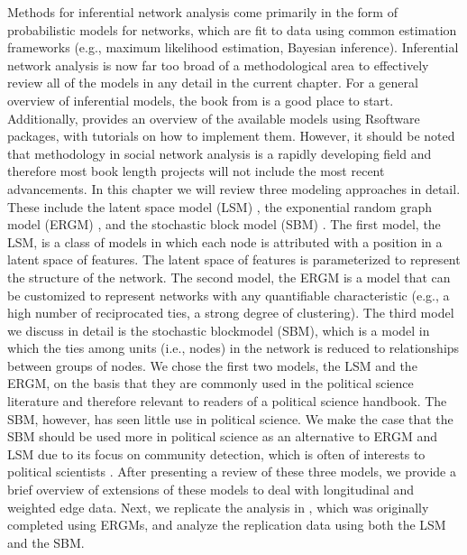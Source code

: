 \documentclass[fleqn,12pt]{wlscirep}
\newcommand{\R}{\textsf{R}\space} %
\begin{document}
 
Methods for inferential network analysis come primarily in the form of probabilistic models for networks, which are fit to data using common estimation frameworks (e.g., maximum likelihood estimation, Bayesian inference). Inferential network analysis is now far too broad of a methodological area to effectively review all of the models in any detail in the current chapter. For a general overview of inferential models, the book from \cite{carrington2005models} is a good place to start. Additionally, \cite{luke2015user} provides an overview of the available models using \R software packages, with tutorials on how to implement them. However, it should be noted that methodology in social network analysis is a rapidly developing field and  therefore most book length projects will not include the most recent advancements. In this chapter we will review three modeling approaches in detail. These include the latent space model (LSM) \citep{dorff2016latent}, the exponential random graph model (ERGM) \citep{cranmer2011inferential}, and the stochastic block model (SBM) \citep{latouche2011overlapping, sweet2015incorporating}. The first model, the LSM, is a class of models in which each node is attributed with a position in a latent space of features. The latent space of features is parameterized to represent the structure of the network. The second model, the ERGM is a model that can be customized to represent networks with any quantifiable characteristic (e.g., a high number of reciprocated ties, a strong degree of clustering).  The third model we discuss in detail is the stochastic blockmodel (SBM), which is a model in which the ties among units (i.e., nodes) in the network is reduced to relationships between groups of nodes. We chose the first two models, the LSM and the ERGM, on the basis that they are commonly used in the political science literature and therefore relevant to readers of a political science handbook. The SBM, however, has seen little use in political science. We make the case that the SBM should be used more in political science as an alternative to ERGM and LSM due to its focus on community detection, which is often of interests to political scientists \citep[e.g., ][]{freelon2015online,desmarais2015fates,majo2019backbone}. After presenting a review of these three models, we provide a brief overview of extensions of these models to deal with longitudinal and weighted edge data. Next, we replicate the analysis in \citet{wojcik2017legislative}, which was originally completed using ERGMs, and analyze the replication data using both the LSM and the SBM. 
\end{document}
